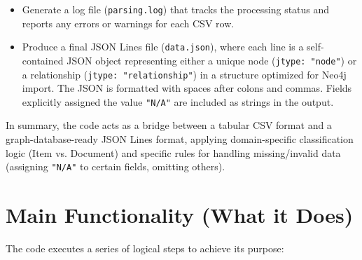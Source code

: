 \documentclass[11pt, a4paper]{article}
\begin{document}
\begin{itemize}
    \item Generate a log file (\texttt{parsing.log}) that tracks the processing status and reports any errors or warnings for each CSV row.
    \item Produce a final JSON Lines file (\texttt{data.json}), where each line is a self-contained JSON object representing either a unique node (\texttt{jtype: "node"}) or a relationship (\texttt{jtype: "relationship"}) in a structure optimized for Neo4j import. The JSON is formatted with spaces after colons and commas. Fields explicitly assigned the value \texttt{"N/A"} are included as strings in the output.
\end{itemize}
In summary, the code acts as a bridge between a tabular CSV format and a graph-database-ready JSON Lines format, applying domain-specific classification logic (Item vs. Document) and specific rules for handling missing/invalid data (assigning \texttt{"N/A"} to certain fields, omitting others).

\section{Main Functionality (What it Does)}
The code executes a series of logical steps to achieve its purpose:
\end{document}
